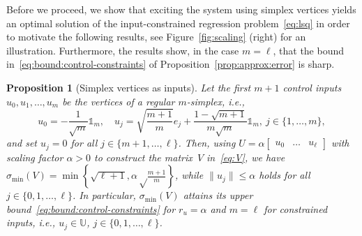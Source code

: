 \documentclass[a4paper, reqno]{amsart}
\newcommand{\dd}{\ell}
\newcommand{\one}{\mathds{1}}
\newtheorem{proposition}[theorem]{Proposition}
\begin{document}
Before we proceed, we show that exciting the system using simplex vertices yields an optimal solution of the input-constrained regression problem~\eqref{eq:lsq} in order to motivate the following results, see Figure~\ref{fig:scaling} (right) for an illustration. Furthermore, the results show, in the case $m=\dd$, that the bound in~\eqref{eq:bound:control-constraints} of Proposition~\ref{prop:approx:error} is sharp.
\begin{proposition}[Simplex vertices as inputs]\label{prop:simplex}
    Let the first $m+1$ control inputs $u_0,u_1,\ldots,u_m$ be the vertices of a regular $m$-simplex, i.e., 
    \[
        u_0  = -\frac{1}{\sqrt{m}} \one_{m}, \quad u_j = \sqrt{\frac{m+1}{m}} e_j + \frac{1-\sqrt{m+1}}{m\sqrt{m}} \one_{m}, \ j \in \{1,\dots,m\},
    \]
    and set $u_j = 0$ for all $j \in \{ m+1,\ldots,\dd\}$. Then, using $U = \alpha\begin{bmatrix}
        u_0&\dots & u_{\dd}
    \end{bmatrix}$ with scaling factor $\alpha>0$ to construct the matrix~$V$ in~\eqref{eq:V}, we have $\sigma_\mathrm{min}(V) = \min\left\lbrace\sqrt{\dd+1}, \alpha \sqrt\frac{m+1}{m}\right\rbrace$, while $\lVert u_j \rVert \leq \alpha$ holds for all $j \in \{0,1,\ldots,\dd\}$.
    In particular, $\sigma_\mathrm{min}(V)$ attains its upper bound~\eqref{eq:bound:control-constraints} for $r_u = \alpha$ and $m = \dd$ for constrained inputs, i.e., $u_j \in \mathbb{U}$, $j \in \{0,1,\ldots,\dd\}$.
\end{proposition}
\end{document}
